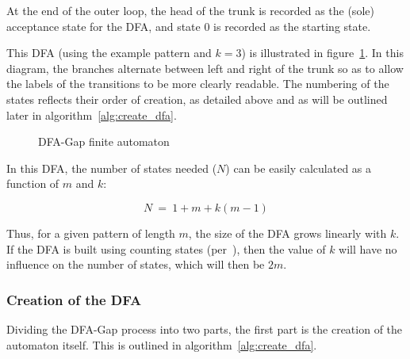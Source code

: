 At the end of the outer loop, the head of the trunk is recorded as the (sole) acceptance state for the DFA, and state 0 is recorded as the starting state.

This DFA (using the example pattern and $k=3$) is illustrated in figure~\ref{fig:dfa_dfa}. In this diagram, the branches alternate between left and right of the trunk so as to allow the labels of the transitions to be more clearly readable. The numbering of the states reflects their order of creation, as detailed above and as will be outlined later in algorithm~\ref{alg:create_dfa}.

\begin{figure}[ht]
\centering

\caption{DFA-Gap finite automaton}
\label{fig:dfa_dfa}
\end{figure}

In this DFA, the number of states needed ($N$) can be easily calculated as a function of $m$ and $k$:

\[N~=~1 + m + k(m - 1)\]

Thus, for a given pattern of length $m$, the size of the DFA grows linearly with $k$. If the DFA is built using counting states (per~\cite{becchi}), then the value of $k$ will have no influence on the number of states, which will then be $2m$.

\subsubsection{Creation of the DFA}

Dividing the DFA-Gap process into two parts, the first part is the creation of the automaton itself. This is outlined in algorithm~\ref{alg:create_dfa}.

